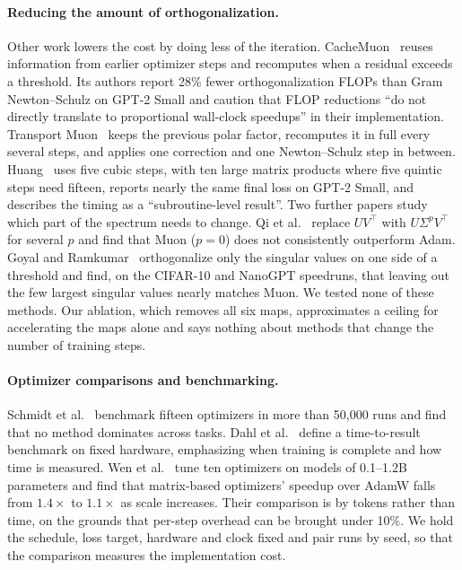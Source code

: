 \documentclass{article}
\begin{document}
\paragraph{Reducing the amount of orthogonalization.} Other work lowers the cost by doing less of the iteration. CacheMuon~\cite{cachemuon} reuses information from earlier optimizer steps and recomputes when a residual exceeds a threshold. Its authors report 28\% fewer orthogonalization FLOPs than Gram Newton--Schulz on GPT-2 Small and caution that FLOP reductions ``do not directly translate to proportional wall-clock speedups'' in their implementation. Transport Muon~\cite{transportmuon} keeps the previous polar factor, recomputes it in full every several steps, and applies one correction and one Newton--Schulz step in between. Huang~\cite{huang} uses five cubic steps, with ten large matrix products where five quintic steps need fifteen, reports nearly the same final loss on GPT-2 Small, and describes the timing as a ``subroutine-level result''. Two further papers study which part of the spectrum needs to change. Qi et al.~\cite{qi} replace $UV^\top$ with $U\Sigma^pV^\top$ for several $p$ and find that Muon ($p=0$) does not consistently outperform Adam. Goyal and Ramkumar~\cite{goyal} orthogonalize only the singular values on one side of a threshold and find, on the CIFAR-10 and NanoGPT speedruns, that leaving out the few largest singular values nearly matches Muon. We tested none of these methods. Our ablation, which removes all six maps, approximates a ceiling for accelerating the maps alone and says nothing about methods that change the number of training steps.

\paragraph{Optimizer comparisons and benchmarking.} Schmidt et al.~\cite{schmidt} benchmark fifteen optimizers in more than 50,000 runs and find that no method dominates across tasks. Dahl et al.~\cite{algoperf} define a time-to-result benchmark on fixed hardware, emphasizing when training is complete and how time is measured. Wen et al.~\cite{fantastic} tune ten optimizers on models of 0.1--1.2B parameters and find that matrix-based optimizers' speedup over AdamW falls from $1.4\times$ to $1.1\times$ as scale increases. Their comparison is by tokens rather than time, on the grounds that per-step overhead can be brought under 10\%. We hold the schedule, loss target, hardware and clock fixed and pair runs by seed, so that the comparison measures the implementation cost.
\end{document}

